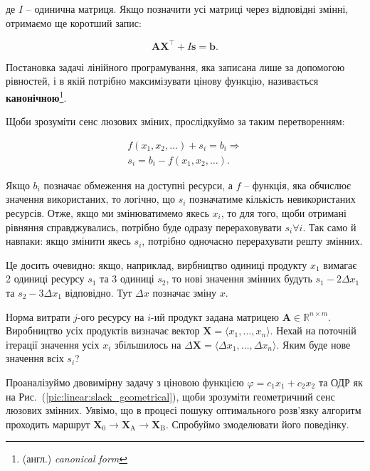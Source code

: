 \documentclass[\main/book.tex]{subfiles}
\begin{document}
де $I$ -- одинична матриця. Якщо позначити усі матриці через відповідні змінні, отримаємо ще коротший запис:

$$
\mathbf{A}\mathbf{X}^\top + I \mathbf{s} = \mathbf{b}.
$$

Постановка задачі лінійного програмування, яка записана лише за допомогою рівностей, і в якій потрібно максимізувати цінову функцію, називається \textbf{канонічною}\footnote{(англ.) \textit{canonical form}}.

Щоби зрозуміти сенс люзових зміних, прослідкуймо за таким перетворенням:

\begin{equation}
\begin{split}
 f(x_1, x_2, \ldots) + s_i = b_i \Rightarrow \\
 s_i = b_i - f(x_1, x_2, \ldots).
\end{split}
\label{eq:linear:slack_variables}
\end{equation}

Якщо $b_i$ позначає обмеження на доступні ресурси, а $f$ -- функція, яка обчислює значення використаних, то логічно, що $s_i$ позначатиме кількість невикористаних ресурсів. Отже, якщо ми змінюватимемо якесь $x_i$, то для того, щоби отримані рівняння справджувались, потрібно буде одразу перераховувати ${s_i \forall i}$. Так само й навпаки: якщо змінити якесь $s_i$, потрібно одночасно перерахувати решту змінних.

\begin{note}
 Це досить очевидно: якщо, наприклад, вирбництво одиниці продукту $x_1$ вимагає 2 одиниці ресурсу $s_1$ та 3 одиниці $s_2$, то нові значення змінних будуть $s_1 - 2 \Delta x_1$ та $s_2 - 3 \Delta x_1$ відповідно. Тут $\Delta x$ позначає зміну $x$.
\end{note}

\begin{question}
 Норма витрати $j$-ого ресурсу на $i$-ий продукт задана матрицею ${\mathbf{A} \in \mathbb{R}^{n \times m}}$. Виробництво усіх продуктів визначає вектор $\mathbf{X} = \langle x_1, \ldots, x_n \rangle$. Нехай на поточній ітерації значення усіх $x_i$ збільшилось на $\Delta \mathbf{X} = \langle \Delta x_1, \ldots, \Delta x_n \rangle$. Яким буде нове значення всіх $s_i$?
\end{question}

Проаналізуймо двовимірну задачу з ціновою функцією $\varphi = c_1 x_1 + c_2 x_2$ та ОДР як на Рис.~(\ref{pic:linear:slack_geometrical}), щоби зрозуміти геометричний сенс люзових змінних. Уявімо, що в процесі пошуку оптимального розв'язку алгоритм проходить маршрут $\mathbf{X}_0 \rightarrow \mathbf{X}_\mathrm{A} \rightarrow \mathbf{X}_\mathrm{B}$. Спробуймо змоделювати його поведінку.
\end{document}
